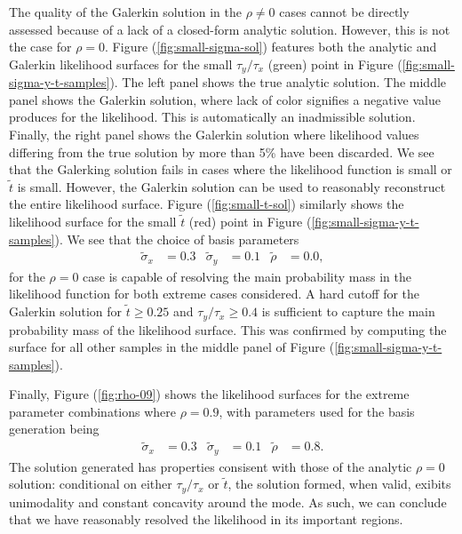\documentclass[10pt]{article}
\begin{document}
\begin{enumerate}
The quality of the Galerkin solution in the $\rho \neq 0$ cases cannot
be directly assessed because of a lack of a closed-form analytic
solution. However, this is not the case for $\rho=0$. Figure
(\ref{fig:small-sigma-sol}) features both the analytic and Galerkin
likelihood surfaces for the small $\tau_y/\tau_x$ (green) point in
Figure (\ref{fig:small-sigma-y-t-samples}). The left panel shows the
true analytic solution. The middle panel shows the Galerkin solution,
where lack of color signifies a negative value produces for the
likelihood. This is automatically an inadmissible solution. Finally,
the right panel shows the Galerkin solution where likelihood values
differing from the true solution by more than 5\% have been
discarded. We see that the Galerking solution fails in cases where the
likelihood function is small or $\tilde{t}$ is small. However, the
Galerkin solution can be used to reasonably reconstruct the entire
likelihood surface. Figure (\ref{fig:small-t-sol}) similarly shows the
likelihood surface for the small $\tilde{t}$ (red) point in Figure
(\ref{fig:small-sigma-y-t-samples}). We see that the choice of basis parameters
\begin{align}
  \tilde{\sigma}_x &= 0.3 &\tilde{\sigma}_y &= 0.1 &\tilde{\rho} &= 0.0,
\end{align}
for the $\rho = 0$ case is capable of resolving the main probability
mass in the likelihood function for both extreme cases considered. A
hard cutoff for the Galerkin solution for $\tilde{t} \geq 0.25$ and
$\tau_y/\tau_x \geq 0.4$ is sufficient to capture the main probability
mass of the likelihood surface. This was confirmed by computing the
surface for all other samples in the middle panel of Figure
(\ref{fig:small-sigma-y-t-samples}).

Finally, Figure (\ref{fig:rho-09}) shows the likelihood surfaces for
the extreme parameter combinations where $\rho = 0.9$, with parameters
used for the basis generation being
\begin{align}
  \tilde{\sigma}_x &= 0.3 &\tilde{\sigma}_y &= 0.1 &\tilde{\rho} &= 0.8.
\end{align}
The solution generated has properties consisent with those of the
analytic $\rho=0$ solution: conditional on either $\tau_y/\tau_x$ or
$\tilde{t}$, the solution formed, when valid, exibits unimodality and
constant concavity around the mode. As such, we can conclude that we
have reasonably resolved the likelihood in its important regions.


\end{enumerate}
\end{document}
